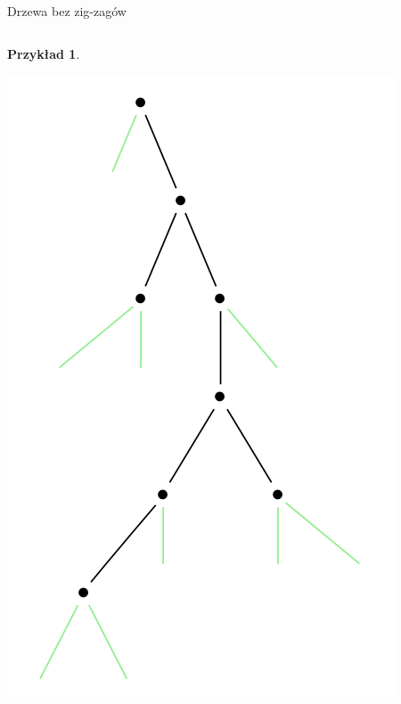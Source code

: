 \documentclass[final]{beamer}
\theoremstyle{bluetheorem}
\theoremstyle{bluetheorem}
\theoremstyle{greentheorem}
\newtheorem{myexample}[mytheorem]{Przykład}
\begin{document}
\begin{frame}{Drzewa bez zig-zagów}
\begin{columns}
        \begin{myexample}
            \begin{center}
                \includegraphics{zigzag_001.png}
            \end{center}
        \end{myexample}
    \end{columns}
\end{frame}
\end{document}
